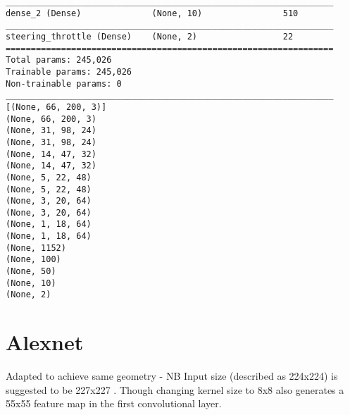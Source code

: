 \begin{verbatim}
_________________________________________________________________
dense_2 (Dense)              (None, 10)                510       
_________________________________________________________________
steering_throttle (Dense)    (None, 2)                 22        
=================================================================
Total params: 245,026    
Trainable params: 245,026
Non-trainable params: 0
_________________________________________________________________
[(None, 66, 200, 3)]
(None, 66, 200, 3)
(None, 31, 98, 24)
(None, 31, 98, 24)
(None, 14, 47, 32)
(None, 14, 47, 32)
(None, 5, 22, 48)
(None, 5, 22, 48)
(None, 3, 20, 64)
(None, 3, 20, 64)
(None, 1, 18, 64)
(None, 1, 18, 64)
(None, 1152)
(None, 100)
(None, 50)
(None, 10)
(None, 2)

\end{verbatim}



\section{Alexnet}
Adapted to achieve same geometry - NB Input size (described as 224x224) is suggested to  be 227x227 \cite{CS231n}. 
Though changing kernel size to 8x8 also generates a 55x55 feature map in the first convolutional layer.

